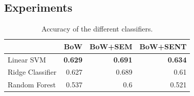 

\subsection{Experiments}
\label{sec:similarity:experiments_class}

\begin{table}[]
\centering
\begin{tabular}{l r r r}
\hline
& BoW & BoW+SEM & BoW+SENT \\ 
\hline
Linear SVM       & \textbf{0.629}           & \textbf{0.691}               & \textbf{0.634}                \\
Ridge Classifier & 0.627                    & 0.689                        & 0.61                          \\
Random Forest    & 0.537                    & 0.6                          & 0.521                         \\ \hline
\end{tabular}
\caption{Accuracy of the different classifiers.}
\label{tbl:similarity:classifiers}
\end{table}

